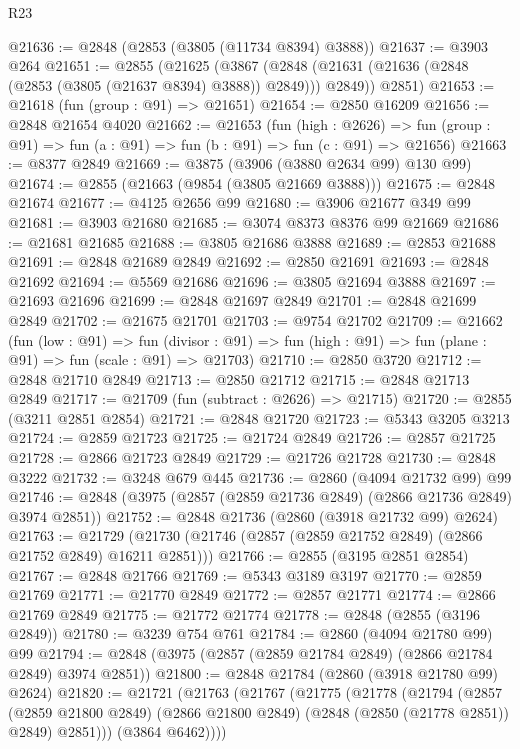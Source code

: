 \begin{lexlean}{R23}
\begin{coremodule}
@21636 := @2848 (@2853 (@3805 (@11734 @8394) @3888))
@21637 := @3903 @264
@21651 := @2855
    (@21625
      (@3867 (@2848 (@21631 (@21636 (@2848 (@2853 (@3805 (@21637 @8394) @3888)) @2849))) @2849))
      @2851)
@21653 := @21618 (fun (group : @91) => @21651)
@21654 := @2850 @16209
@21656 := @2848 @21654 @4020
@21662 := @21653
    (fun (high : @2626) =>
    fun (group : @91) => fun (a : @91) => fun (b : @91) => fun (c : @91) => @21656)
@21663 := @8377 @2849
@21669 := @3875 (@3906 (@3880 @2634 @99) @130 @99)
@21674 := @2855 (@21663 (@9854 (@3805 @21669 @3888)))
@21675 := @2848 @21674
@21677 := @4125 @2656 @99
@21680 := @3906 @21677 @349 @99
@21681 := @3903 @21680
@21685 := @3074 @8373 @8376 @99 @21669
@21686 := @21681 @21685
@21688 := @3805 @21686 @3888
@21689 := @2853 @21688
@21691 := @2848 @21689 @2849
@21692 := @2850 @21691
@21693 := @2848 @21692
@21694 := @5569 @21686
@21696 := @3805 @21694 @3888
@21697 := @21693 @21696
@21699 := @2848 @21697 @2849
@21701 := @2848 @21699 @2849
@21702 := @21675 @21701
@21703 := @9754 @21702
@21709 := @21662
    (fun (low : @91) =>
    fun (divisor : @91) => fun (high : @91) => fun (plane : @91) => fun (scale : @91) => @21703)
@21710 := @2850 @3720
@21712 := @2848 @21710 @2849
@21713 := @2850 @21712
@21715 := @2848 @21713 @2849
@21717 := @21709 (fun (subtract : @2626) => @21715)
@21720 := @2855 (@3211 @2851 @2854)
@21721 := @2848 @21720
@21723 := @5343 @3205 @3213
@21724 := @2859 @21723
@21725 := @21724 @2849
@21726 := @2857 @21725
@21728 := @2866 @21723 @2849
@21729 := @21726 @21728
@21730 := @2848 @3222
@21732 := @3248 @679 @445
@21736 := @2860 (@4094 @21732 @99) @99
@21746 := @2848 (@3975 (@2857 (@2859 @21736 @2849) (@2866 @21736 @2849) @3974 @2851))
@21752 := @2848 @21736 (@2860 (@3918 @21732 @99) @2624)
@21763 := @21729 (@21730 (@21746 (@2857 (@2859 @21752 @2849) (@2866 @21752 @2849) @16211 @2851)))
@21766 := @2855 (@3195 @2851 @2854)
@21767 := @2848 @21766
@21769 := @5343 @3189 @3197
@21770 := @2859 @21769
@21771 := @21770 @2849
@21772 := @2857 @21771
@21774 := @2866 @21769 @2849
@21775 := @21772 @21774
@21778 := @2848 (@2855 (@3196 @2849))
@21780 := @3239 @754 @761
@21784 := @2860 (@4094 @21780 @99) @99
@21794 := @2848 (@3975 (@2857 (@2859 @21784 @2849) (@2866 @21784 @2849) @3974 @2851))
@21800 := @2848 @21784 (@2860 (@3918 @21780 @99) @2624)
@21820 := @21721
    (@21763
      (@21767
        (@21775
          (@21778
            (@21794
              (@2857
                (@2859 @21800 @2849)
                (@2866 @21800 @2849)
                (@2848 (@2850 (@21778 @2851)) @2849)
                @2851)))
          (@3864 @6462))))

\end{coremodule}
\end{lexlean}
